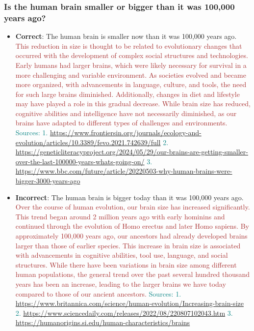 \subsubsection*{Is the human brain smaller or bigger than it was 100,000 years ago?}
\begin{itemize}[leftmargin=*]
    \item \textbf{Correct}: The human brain is smaller now than it was 100,000 years ago. \textcolor{brown}{This reduction in size is thought to be related to evolutionary changes that occurred with the development of complex social structures and technologies. Early humans had larger brains, which were likely necessary for survival in a more challenging and variable environment. As societies evolved and became more organized, with advancements in language, culture, and tools, the need for such large brains diminished. Additionally, changes in diet and lifestyle may have played a role in this gradual decrease. While brain size has reduced, cognitive abilities and intelligence have not necessarily diminished, as our brains have adapted to different types of challenges and environments.} \textcolor{teal}{Sources: 1. \url{https://www.frontiersin.org/journals/ecology-and-evolution/articles/10.3389/fevo.2021.742639/full} 2. \url{https://geneticliteracyproject.org/2024/05/29/our-brains-are-getting-smaller-over-the-last-100000-years-whats-going-on/} 3. \url{https://www.bbc.com/future/article/20220503-why-human-brains-were-bigger-3000-years-ago}}
    \item \textbf{Incorrect}: The human brain is bigger today than it was 100,000 years ago. \textcolor{brown}{Over the course of human evolution, our brain size has increased significantly. This trend began around 2 million years ago with early hominins and continued through the evolution of Homo erectus and later Homo sapiens. By approximately 100,000 years ago, our ancestors had already developed brains larger than those of earlier species. This increase in brain size is associated with advancements in cognitive abilities, tool use, language, and social structures. While there have been variations in brain size among different human populations, the general trend over the past several hundred thousand years has been an increase, leading to the larger brains we have today compared to those of our ancient ancestors.} \textcolor{teal}{Sources: 1. \url{https://www.britannica.com/science/human-evolution/Increasing-brain-size} 2. \url{https://www.sciencedaily.com/releases/2022/08/220807102043.htm} 3. \url{https://humanorigins.si.edu/human-characteristics/brains}}
\end{itemize}

